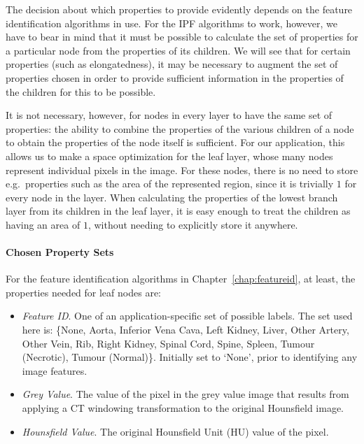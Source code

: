 The decision about which properties to provide evidently depends on the feature identification algorithms in use. For the IPF algorithms to work, however, we have to bear in mind that it must be possible to calculate the set of properties for a particular node from the properties of its children. We will see that for certain properties (such as elongatedness), it may be necessary to augment the set of properties chosen in order to provide sufficient information in the properties of the children for this to be possible.

It is not necessary, however, for nodes in every layer to have the same set of properties: the ability to combine the properties of the various children of a node to obtain the properties of the node itself is sufficient. For our application, this allows us to make a space optimization for the leaf layer, whose many nodes represent individual pixels in the image. For these nodes, there is no need to store e.g.~properties such as the area of the represented region, since it is trivially $1$ for every node in the layer. When calculating the properties of the lowest branch layer from its children in the leaf layer, it is easy enough to treat the children as having an area of $1$, without needing to explicitly store it anywhere.

\paragraph{Chosen Property Sets}

For the feature identification algorithms in Chapter~\ref{chap:featureid}, at least, the properties needed for leaf nodes are:

\begin{itemize}

\item \emph{Feature ID}. One of an application-specific set of possible labels. The set used here is: \{None, Aorta, Inferior Vena Cava, Left Kidney, Liver, Other Artery, Other Vein, Rib, Right Kidney, Spinal Cord, Spine, Spleen, Tumour (Necrotic), Tumour (Normal)\}. Initially set to `None', prior to identifying any image features.

\item \emph{Grey Value}. The value of the pixel in the grey value image that results from applying a CT windowing transformation to the original Hounsfield image.

\item \emph{Hounsfield Value}. The original Hounsfield Unit (HU) value of the pixel.

\end{itemize}

